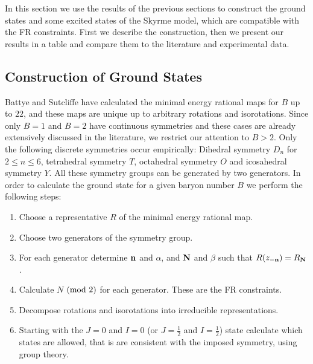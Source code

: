 \documentclass[a4paper,12pt]{article}
\begin{document}
In this section we use the results of the previous sections to construct the 
ground states and some excited states of the Skyrme model, which are 
compatible with the FR constraints. First we describe the construction, 
then we present our results in a table and compare them to the literature 
and experimental data. 


\subsection{Construction of Ground States}
\label{Construction}

Battye and Sutcliffe have calculated the minimal energy rational 
maps for $B$ up to $22$, and 
these maps are unique up to arbitrary rotations and isorotations. Since 
only $B=1$ and $B=2$ have continuous symmetries and these cases are already 
extensively discussed in the literature, we restrict our attention to $B>2$. 
Only the following discrete symmetries occur empirically: 
Dihedral symmetry $D_n$ for $2 \leq n \leq 6$, tetrahedral symmetry $T$, 
octahedral symmetry $O$ and  icosahedral symmetry $Y$. All these symmetry 
groups can be generated by two generators. In order to calculate the 
ground state for a given baryon number $B$ we perform the following steps: 

\begin{enumerate}
\item Choose a representative $R$ of the minimal energy rational map.
\item Choose two generators of the symmetry group.
\item For each generator determine ${\bf n}$ and $\alpha$, and ${\bf N}$ 
and $\beta$ such that $R(z_{-{\bf n}}) = R_{{\bf N}}$.
\item Calculate $N$ $({\rm mod}\ 2)$ for each generator. These are the FR 
constraints.
\item Decompose rotations and isorotations into irreducible representations.
\item Starting with the $J=0$ and $I=0$ (or $J = \frac{1}{2}$ and 
$I = \frac{1}{2}$) state calculate which states are allowed, that 
is are consistent with the imposed symmetry, using group theory.
\end{enumerate}
\end{document}
